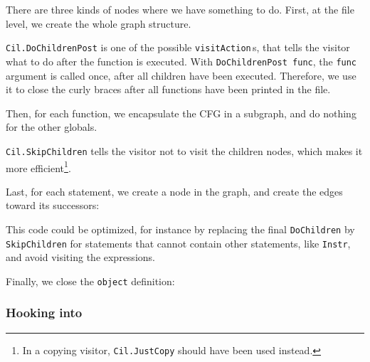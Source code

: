 There are three kinds of nodes where we have something to do. First,
at the file level, we create the whole graph structure.


\texttt{Cil.DoChildrenPost} is one of the possible
\texttt{visitAction}\,s, that tells the visitor what to do after the
function is executed. With \texttt{DoChildrenPost func}, the \texttt{func}
argument is called once, after all children have been executed. Therefore,
we use it to close the curly braces after all functions have been printed
in the file.

Then, for each function, we encapsulate the CFG in a subgraph, and do
nothing for the other globals.


\texttt{Cil.SkipChildren} tells the visitor not to visit the children
nodes, which makes it more efficient\footnote{In a copying visitor,
\texttt{Cil.JustCopy}
should have been used instead.}.

Last, for each statement, we create a node in the graph, and create
the edges toward its successors:


This code could be optimized, for instance by replacing the final
\texttt{DoChildren} by \texttt{SkipChildren} for statements that
cannot contain other statements, like \texttt{Instr}, and avoid
visiting the expressions.

Finally, we close the \texttt{object} definition:

\subsubsection*{Hooking into \framac}

